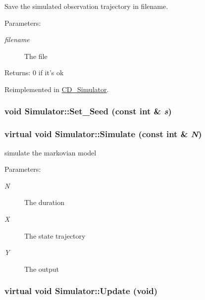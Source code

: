 Save the simulated observation trajectory in filename. 

\begin{Desc}
\item[Parameters:]
\begin{description}
\item[{\em filename}]The file\end{description}
\end{Desc}
\begin{Desc}
\item[Returns:]0 if it's ok \end{Desc}


Reimplemented in \hyperlink{class_c_d___simulator_f9d3fb4fbc4b77afd81fb8b67e003cee}{CD\_\-Simulator}.\hypertarget{class_simulator_e754c135109204307e1fe08f13d8bcf6}{
\subsubsection[{Set\_\-Seed}]{\setlength{\rightskip}{0pt plus 5cm}void Simulator::Set\_\-Seed (const int \& {\em s})}}
\label{class_simulator_e754c135109204307e1fe08f13d8bcf6}


\hypertarget{class_simulator_72b85e07dd0f69c4efac9178fbd2760a}{
\subsubsection[{Simulate}]{\setlength{\rightskip}{0pt plus 5cm}virtual void Simulator::Simulate (const int \& {\em N})}}
\label{class_simulator_72b85e07dd0f69c4efac9178fbd2760a}


simulate the markovian model 

\begin{Desc}
\item[Parameters:]
\begin{description}
\item[{\em N}]The duration \item[{\em X}]The state trajectory \item[{\em Y}]The output \end{description}
\end{Desc}
\hypertarget{class_simulator_7d25eafb65a104053c4fcb676ca71d1f}{
\subsubsection[{Update}]{\setlength{\rightskip}{0pt plus 5cm}virtual void Simulator::Update (void)}}
\label{class_simulator_7d25eafb65a104053c4fcb676ca71d1f}


